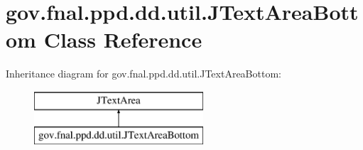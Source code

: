 \hypertarget{classgov_1_1fnal_1_1ppd_1_1dd_1_1util_1_1JTextAreaBottom}{\section{gov.\-fnal.\-ppd.\-dd.\-util.\-J\-Text\-Area\-Bottom Class Reference}
\label{classgov_1_1fnal_1_1ppd_1_1dd_1_1util_1_1JTextAreaBottom}
}
Inheritance diagram for gov.\-fnal.\-ppd.\-dd.\-util.\-J\-Text\-Area\-Bottom\-:\begin{figure}[H]
\begin{center}
\leavevmode
\includegraphics[height=2.000000cm]{classgov_1_1fnal_1_1ppd_1_1dd_1_1util_1_1JTextAreaBottom}
\end{center}
\end{figure}
